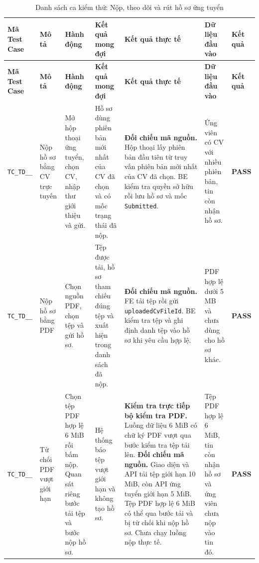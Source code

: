 \begin{landscape}
{
\fontsize{9.5}{11.5}\selectfont
\setlength{\tabcolsep}{3pt}
\renewcommand{\arraystretch}{1.2}
\begin{longtable}{|>{\raggedright\arraybackslash}p{2.1cm}|>{\raggedright\arraybackslash}p{2.8cm}|>{\raggedright\arraybackslash}p{3.8cm}|>{\raggedright\arraybackslash}p{4.0cm}|>{\raggedright\arraybackslash}p{5.0cm}|>{\raggedright\arraybackslash}p{3.2cm}|>{\centering\arraybackslash}p{1.3cm}|}
    \caption{Danh sách ca kiểm thử: Nộp, theo dõi và rút hồ sơ ứng tuyển} \label{tab:ts-td-04} \\
    \hline
    \textbf{Mã Test Case} & \textbf{Mô tả} & \textbf{Hành động} & \textbf{Kết quả mong đợi} & \textbf{Kết quả thực tế} & \textbf{Dữ liệu đầu vào} & \textbf{Kết quả} \\
    \hline
    \endfirsthead
    \hline
    \textbf{Mã Test Case} & \textbf{Mô tả} & \textbf{Hành động} & \textbf{Kết quả mong đợi} & \textbf{Kết quả thực tế} & \textbf{Dữ liệu đầu vào} & \textbf{Kết quả} \\
    \hline
    \endhead
    \hline
    \endfoot
    \hline
    \endlastfoot
    \texttt{TC\_\allowbreak TD\_\allowbreak 04\_\allowbreak 01} & Nộp hồ sơ bằng CV trực tuyến & Mở hộp thoại ứng tuyển, chọn CV, nhập thư giới thiệu và gửi. & Hồ sơ dùng phiên bản mới nhất của CV đã chọn và có mốc trạng thái đã nộp. & \textbf{Đối chiếu mã nguồn.} Hộp thoại lấy phiên bản đầu tiên từ truy vấn phiên bản mới nhất của CV đã chọn. BE kiểm tra quyền sở hữu rồi lưu hồ sơ và mốc \texttt{Submitted}. & Ứng viên có CV với nhiều phiên bản, tin còn nhận hồ sơ. & \textbf{PASS} \\
    \hline
    \texttt{TC\_\allowbreak TD\_\allowbreak 04\_\allowbreak 02} & Nộp hồ sơ bằng PDF & Chọn nguồn PDF, chọn tệp và gửi hồ sơ. & Tệp được tải, hồ sơ tham chiếu đúng tệp và xuất hiện trong danh sách đã nộp. & \textbf{Đối chiếu mã nguồn.} FE tải tệp rồi gửi \texttt{uploadedCvFileId}. BE kiểm tra tệp và ghi định danh tệp vào hồ sơ khi yêu cầu hợp lệ. & PDF hợp lệ dưới 5 MB và chưa dùng cho hồ sơ khác. & \textbf{PASS} \\
    \hline
    \texttt{TC\_\allowbreak TD\_\allowbreak 04\_\allowbreak 03} & Từ chối PDF vượt giới hạn & Chọn tệp PDF hợp lệ 6 MiB rồi bấm nộp. Quan sát riêng bước tải tệp và bước nộp hồ sơ. & Hệ thống báo tệp vượt giới hạn và không tạo hồ sơ. & \textbf{Kiểm tra trực tiếp bộ kiểm tra PDF.} Luồng dữ liệu 6 MiB có chữ ký PDF vượt qua bước kiểm tra tệp tải lên. \textbf{Đối chiếu mã nguồn.} Giao diện và API tải tệp giới hạn 10 MiB, còn API ứng tuyển giới hạn 5 MiB. Tệp PDF hợp lệ 6 MiB có thể qua bước tải và bị từ chối khi nộp hồ sơ. Chưa chạy luồng nộp thực tế. & Tệp PDF hợp lệ 6 MiB, tin còn nhận hồ sơ và ứng viên chưa nộp vào tin đó. & \textbf{PASS} \\

\end{longtable}}
\end{landscape}
